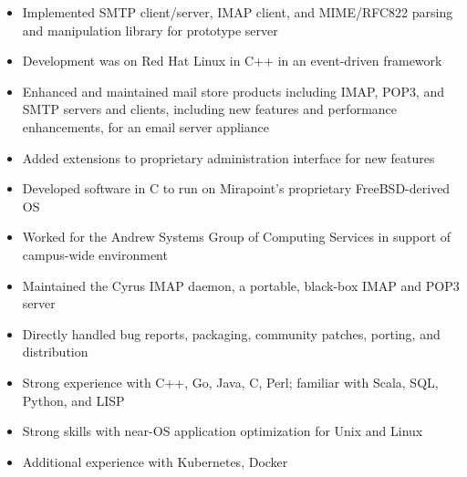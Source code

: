 \documentclass[letterpaper,11pt,twoside]{article}
\begin{document}
\vspace{-14pt}
\begin{itemize}
\item Implemented SMTP client/server, IMAP client, and
  MIME/RFC822 parsing and manipulation library for prototype server
\item Development was on Red Hat Linux in C++ in an event-driven framework
\end{itemize}


\vspace{-14pt}
\begin{itemize}
\item Enhanced and maintained mail store products including
  IMAP, POP3, and SMTP servers and clients, including new features
  and performance enhancements, for an email server appliance
\item Added extensions to proprietary administration interface for new
  features
\item Developed software in C to run on Mirapoint’s proprietary
  FreeBSD-derived OS
\end{itemize}

\vspace{-14pt}
\begin{itemize}
\item Worked for the Andrew Systems Group of Computing Services in
  support of campus-wide environment
\item Maintained the Cyrus IMAP daemon, a portable, black-box IMAP and
  POP3 server
\item Directly handled bug reports, packaging, community patches,
  porting, and distribution
\end{itemize}

\vspace{2pt}

\vspace{-6pt}
\begin{itemize}
\item Strong experience with C++, Go, Java, C, Perl; familiar with
  Scala, SQL, Python, and LISP
\item Strong skills with near-OS application optimization for Unix and Linux
\item Additional experience with Kubernetes, Docker
\end{itemize}
\end{document}
